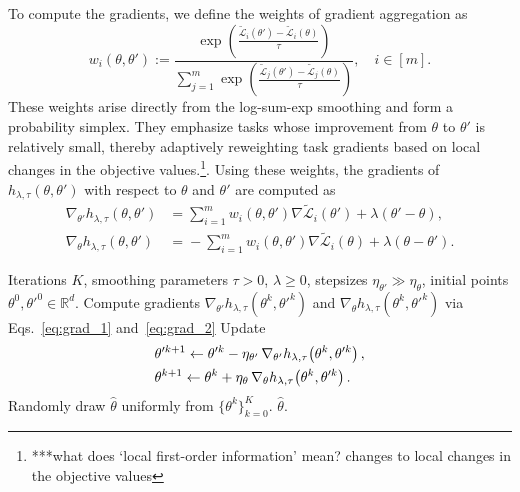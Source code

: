 \documentclass[sigconf]{acmart}
\begin{document}
To compute the gradients, we define the weights of gradient aggregation as
\[
w_i(\theta,\theta') :=
\frac{\exp\!\left(\frac{\tilde{\mathcal{L}}_i(\theta')-\tilde{\mathcal{L}}_i(\theta)}{\tau}\right)}
{\sum_{j=1}^m \exp\!\left(\frac{\tilde{\mathcal{L}}_j(\theta')-\tilde{\mathcal{L}}_j(\theta)}{\tau}\right)}, 
\quad i\in[m].
\]
These weights arise directly from the log-sum-exp smoothing and form a probability simplex. They emphasize tasks whose improvement from $\theta$ to $\theta'$ is relatively small, thereby adaptively reweighting task gradients based on local changes in the objective values.\footnote{***what does `local first-order information' mean?  changes to local changes in the objective values}. %
Using these weights, the gradients of $h_{\lambda,\tau}(\theta,\theta')$ with respect to $\theta$ and $\theta'$ are computed as
\begin{align}
\nabla_{\theta'} h_{\lambda,\tau}(\theta,\theta')
&=
\sum_{i=1}^m w_i(\theta,\theta')\nabla \tilde{\mathcal{L}}_i(\theta')
+
\lambda(\theta'-\theta),
\label{eq:grad_1}
\\\!
\nabla_{\theta} h_{\lambda,\tau}(\theta,\theta')
&=\!
-\sum_{i=1}^m w_i(\theta,\theta')\!\nabla \tilde{\mathcal{L}}_i(\theta)
\!+\! \lambda(\theta-\theta').
\label{eq:grad_2}
\end{align}


\begin{algorithm}[t]
\caption{TTGDA Algorithm}
\label{alg1}
\begin{algorithmic}[1]
\Require Iterations $K$, smoothing parameters $\tau>0$, $\lambda\ge 0$,
stepsizes $\eta_{\theta'} \gg \eta_{\theta}$,
initial points $\theta^{0},\theta'^{0}\in\mathbb{R}^d$.
\State Compute gradients $\nabla_{\theta'} h_{\lambda,\tau}(\theta^{k},\!\theta'^{k})$ and $\nabla_{\theta} h_{\lambda,\tau}(\theta^{k},\!\theta'^{k})$ via Eqs.~\eqref{eq:grad_1} and~\eqref{eq:grad_2}
    \State Update
    \begin{align}
        &\theta'^{k+1} \leftarrow \theta'^{k} - \eta_{\theta'}\, \nabla_{\theta'} h_{\lambda,\tau}\!\left(\theta^{k},\theta'^{k}\right),\notag \\
        &\theta^{k+1}\leftarrow \theta^{k} + \eta_{\theta}\, \nabla_{\theta} h_{\lambda,\tau}\!\left(\theta^{k},\theta'^{k}\right). \notag
    \end{align}
\EndFor
\State Randomly draw $\hat{\theta}$ uniformly from $\{\theta^k\}_{k=0}^{K}$.
\Ensure $\hat{\theta}$.
\end{algorithmic}
\end{algorithm}
\end{document}
